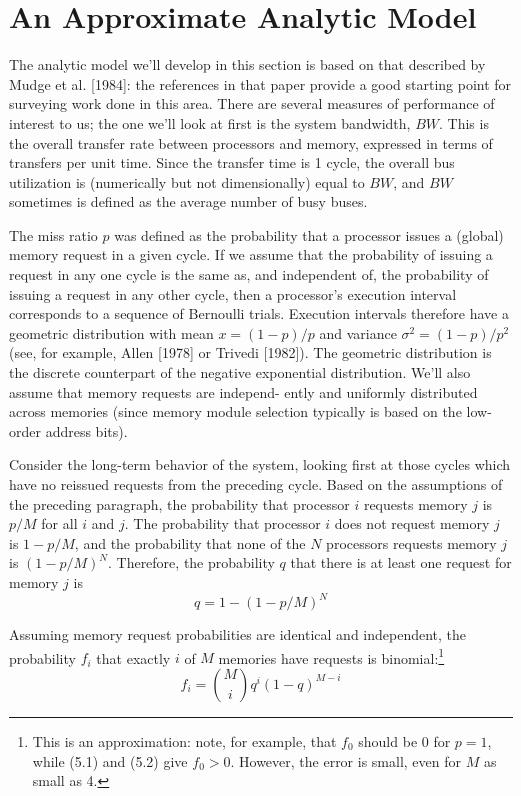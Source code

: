 \section{An Approximate Analytic Model}
\label{sec:mp-analytic-model}

The analytic model we'll develop in this section is based on that
described by Mudge et al. [1984]: the references in that paper provide a good
starting point for surveying work done in this area. There are several
measures of performance of interest to us; the one we'll look at first is the
system bandwidth, $BW$. This is the overall transfer rate between processors
and memory, expressed in terms of transfers per unit time. Since the transfer
time is 1 cycle, the overall bus utilization is (numerically but not
dimensionally) equal to $BW$, and $BW$ sometimes is defined as the average
number of busy buses.

The miss ratio $p$ was defined as the probability that a processor issues a
(global) memory request in a given cycle. If we assume that the probability
of issuing a request in any one cycle is the same as, and independent of, the
probability of issuing a request in any other cycle, then a processor's
execution interval corresponds to a sequence of Bernoulli trials. Execution
intervals therefore have a geometric distribution with mean $x=(1-p)/p$
and variance $\sigma^2=(1-p)/p^2$ (see, for example, Allen [1978] or Trivedi
[1982]). The geometric distribution is the discrete counterpart of the negative
exponential distribution. We'll also assume that memory requests are independ-
\noindent ently and uniformly distributed across memories (since memory module
selection typically is based on the low-order address bits).

Consider the long-term behavior of the system, looking first at those
cycles which have no reissued requests from the preceding cycle. Based on
the assumptions of the preceding paragraph, the probability that processor $i$
requests memory $j$ is $p/M$ for all $i$ and $j$. The probability that processor $i$ does
not request memory $j$ is $1-p/M$, and the probability that none of the $N$
processors requests memory $j$ is $(1-p/M)^N$. Therefore, the probability $q$ that
there is at least one request for memory $j$ is
\begin{equation}
q=1-(1-p/M)^N
\label{eq:mp-q-p}
\end{equation}

Assuming memory request probabilities are identical and independent, the
probability $f_i$ that exactly $i$ of $M$ memories have requests is binomial:\footnote{This is an approximation: note, for example, that $f_0$ should be 0 for $p=1$, while (5.1) and (5.2) give $f_0>0$. However, the error is small, even for $M$ as small as 4.}
\begin{equation}
f_i=\binom{M}{i}q^i(1-q)^{M-i}
\label{eq:mp-fi}
\end{equation}

